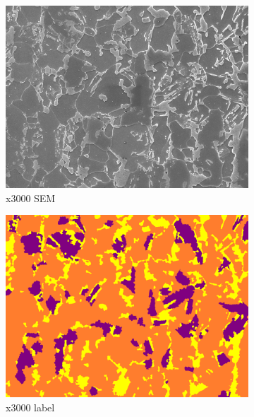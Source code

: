 \documentclass[]{article}
\begin{document}
\begin{figure}[ht]
	\centering
	\begin{subfigure}[b]{0.2\textwidth}
		\centering
		\includegraphics[width=\textwidth]{images/x3000/1.png}
		\caption{x3000 SEM}
		\label{fig:image2.1.1}
	\end{subfigure}
	\begin{subfigure}[b]{0.2\textwidth}
		\centering
		\includegraphics[width=\textwidth]{images/x3000/1_label.png}
		\caption{x3000 label}
		\label{fig:image2.1.2}
	\end{subfigure}
	\hfill
	\begin{subfigure}[b]{0.2\textwidth}
		\centering

\end{subfigure}
\end{figure}
\end{document}
